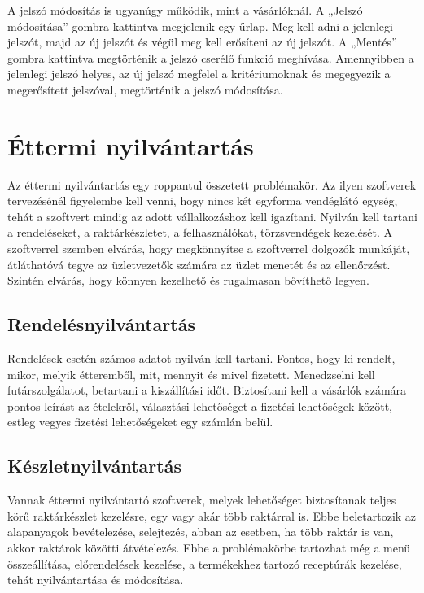 A jelszó módosítás is ugyanúgy működik, mint a vásárlóknál. A „Jelszó módosítása” gombra kattintva megjelenik egy űrlap. Meg kell adni a jelenlegi jelszót, majd az új jelszót és végül meg kell erősíteni az új jelszót. A „Mentés” gombra kattintva megtörténik a jelszó cserélő funkció meghívása. Amennyibben a jelenlegi jelszó helyes, az új jelszó megfelel a kritériumoknak és megegyezik a megerősített jelszóval, megtörténik a jelszó módosítása.

\section{Éttermi nyilvántartás}

Az éttermi nyilvántartás egy roppantul összetett problémakör. Az ilyen szoftverek tervezésénél figyelembe kell venni, hogy nincs két egyforma vendéglátó egység, tehát a szoftvert mindig az adott vállalkozáshoz kell igazítani. Nyilván kell tartani a rendeléseket, a raktárkészletet, a felhasználókat, törzsvendégek kezelését. A szoftverrel szemben elvárás, hogy megkönnyítse a szoftverrel dolgozók munkáját, átláthatóvá tegye az üzletvezetők számára az üzlet menetét és az ellenőrzést. Szintén elvárás, hogy könnyen kezelhető és rugalmasan bővíthető legyen.

\subsection{Rendelésnyilvántartás}

Rendelések esetén számos adatot nyilván kell tartani. Fontos, hogy ki rendelt, mikor, melyik étteremből, mit, mennyit és mivel fizetett. Menedzselni kell futárszolgálatot, betartani a kiszállítási időt. Biztosítani kell a vásárlók számára pontos leírást az ételekről, választási lehetőséget a fizetési lehetőségek között, estleg vegyes fizetési lehetőségeket egy számlán belül.

\subsection{Készletnyilvántartás}

Vannak éttermi nyilvántartó szoftverek, melyek lehetőséget biztosítanak teljes körű raktárkészlet kezelésre, egy vagy akár több raktárral is. Ebbe beletartozik az alapanyagok bevételezése, selejtezés, abban az esetben, ha több raktár is van, akkor raktárok közötti átvételezés.
Ebbe a problémakörbe tartozhat még a menü összeállítása, előrendelések kezelése, a termékekhez tartozó receptúrák kezelése, tehát nyilvántartása és módosítása.

